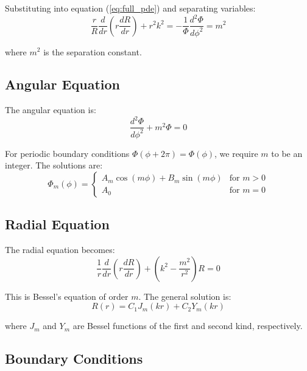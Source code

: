 \documentclass[11pt,a4paper]{article}
\begin{document}
Substituting into equation (\ref{eq:full_pde}) and separating variables:
\begin{equation}
\frac{r}{R}\frac{d}{dr}\left(r \frac{dR}{dr}\right) + r^2 k^2 = -\frac{1}{\Phi}\frac{d^2\Phi}{d\phi^2} = m^2 \label{eq:separated}
\end{equation}

where $m^2$ is the separation constant.

\subsection{Angular Equation}

The angular equation is:
\begin{equation}
\frac{d^2\Phi}{d\phi^2} + m^2 \Phi = 0 \label{eq:angular}
\end{equation}

For periodic boundary conditions $\Phi(\phi + 2\pi) = \Phi(\phi)$, we require $m$ to be an integer. The solutions are:
\begin{equation}
\Phi_m(\phi) = \begin{cases}
A_m \cos(m\phi) + B_m \sin(m\phi) & \text{for } m > 0 \\
A_0 & \text{for } m = 0
\end{cases} \label{eq:angular_sol}
\end{equation}

\subsection{Radial Equation}

The radial equation becomes:
\begin{equation}
\frac{1}{r}\frac{d}{dr}\left(r \frac{dR}{dr}\right) + \left(k^2 - \frac{m^2}{r^2}\right)R = 0 \label{eq:radial}
\end{equation}

This is Bessel's equation of order $m$. The general solution is:
\begin{equation}
R(r) = C_1 J_m(kr) + C_2 Y_m(kr) \label{eq:bessel_general}
\end{equation}

where $J_m$ and $Y_m$ are Bessel functions of the first and second kind, respectively.

\subsection{Boundary Conditions}
\end{document}
